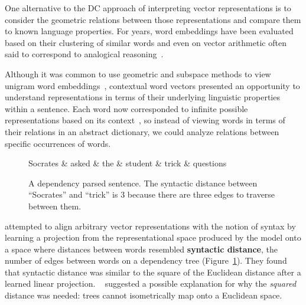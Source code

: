 One alternative to the DC approach of interpreting vector representations is to consider the geometric relations between those representations and compare them to known language properties. For years, word embeddings have been evaluated based on their clustering of similar words and even on vector arithmetic often said to correspond to analogical reasoning~\citep{mikolov_efficient_2013,pennington_glove_2014,saphra_evaluating_2016}. 

Although it was common to use geometric and subspace methods to view unigram word embeddings~\citep{mimno_strange_2017,mu_all-but--top_2017}, contextual word vectors presented an opportunity to understand representations in terms of their underlying linguistic properties within a sentence. Each word now corresponded to infinite possible representations based on its context~\citep{ethayarajh_how_2019}, so instead of viewing words in terms of their relations in an abstract dictionary, we could analyze relations between specific occurrences of words. 

\begin{figure}\begin{center}
    \begin{dependency}[theme = simple]\small
        \begin{deptext}[column sep=1em]
          Socrates \& asked \& the \& student \& trick \& questions \\
        \end{deptext}
    \end{dependency}\end{center}
    \caption{A dependency parsed sentence. The syntactic distance between ``Socrates'' and ``trick'' is 3 because there are three edges to traverse between them.} \label{fig:dependency_parse}
\end{figure}

\citet{hewitt_structural_2019} attempted to align arbitrary vector representations with the notion of syntax by learning a projection from the representational space produced by the model onto a space where distances between words resembled \textbf{syntactic distance}, the number of edges between words on a dependency tree (Figure~\ref{fig:dependency_parse}). They found that syntactic distance was similar to the square of the Euclidean distance after a learned linear projection. ~\citet{reif_visualizing_2019} suggested a possible explanation for why the \textit{squared} distance was needed: trees cannot isometrically map onto a Euclidean space.

